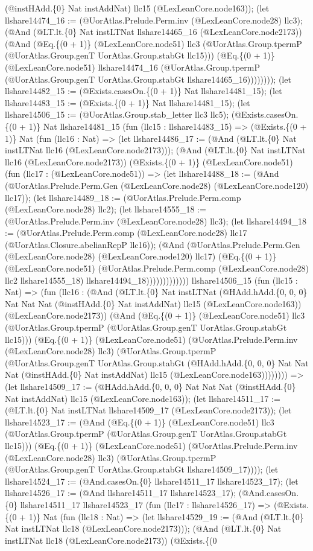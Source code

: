 \documentclass[11pt]{article}
\begin{document}
(@instHAdd.\{0\} Nat instAddNat) llc15 (@LexLeanCore.node163)); (let llshare14474\_16 := (@UorAtlas.Prelude.Perm.inv (@LexLeanCore.node28) llc3); (@And (@LT.lt.\{0\} Nat instLTNat llshare14465\_16 (@LexLeanCore.node2173)) (@And (@Eq.\{(0 + 1)\} (@LexLeanCore.node51) llc3 (@UorAtlas.Group.tpermP (@UorAtlas.Group.genT UorAtlas.Group.stabGt llc15))) (@Eq.\{(0 + 1)\} (@LexLeanCore.node51) llshare14474\_16 (@UorAtlas.Group.tpermP (@UorAtlas.Group.genT UorAtlas.Group.stabGt llshare14465\_16)))))))); (let llshare14482\_15 := (@Exists.casesOn.\{(0 + 1)\} Nat llshare14481\_15); (let llshare14483\_15 := (@Exists.\{(0 + 1)\} Nat llshare14481\_15); (let llshare14506\_15 := (@UorAtlas.Group.stab\_letter llc3 llc5); (@Exists.casesOn.\{(0 + 1)\} Nat llshare14481\_15 (fun (llc15 : llshare14483\_15) => (@Exists.\{(0 + 1)\} Nat (fun (llc16 : Nat) => (let llshare14486\_17 := (@And (@LT.lt.\{0\} Nat instLTNat llc16 (@LexLeanCore.node2173))); (@And (@LT.lt.\{0\} Nat instLTNat llc16 (@LexLeanCore.node2173)) (@Exists.\{(0 + 1)\} (@LexLeanCore.node51) (fun (llc17 : (@LexLeanCore.node51)) => (let llshare14488\_18 := (@And (@UorAtlas.Prelude.Perm.Gen (@LexLeanCore.node28) (@LexLeanCore.node120) llc17)); (let llshare14489\_18 := (@UorAtlas.Prelude.Perm.comp (@LexLeanCore.node28) llc2); (let llshare14555\_18 := (@UorAtlas.Prelude.Perm.inv (@LexLeanCore.node28) llc3); (let llshare14494\_18 := (@UorAtlas.Prelude.Perm.comp (@LexLeanCore.node28) llc17 (@UorAtlas.Closure.abelianRepP llc16)); (@And (@UorAtlas.Prelude.Perm.Gen (@LexLeanCore.node28) (@LexLeanCore.node120) llc17) (@Eq.\{(0 + 1)\} (@LexLeanCore.node51) (@UorAtlas.Prelude.Perm.comp (@LexLeanCore.node28) llc2 llshare14555\_18) llshare14494\_18))))))))))))) llshare14506\_15 (fun (llc15 : Nat) => (fun (llc16 : (@And (@LT.lt.\{0\} Nat instLTNat (@HAdd.hAdd.\{0, 0, 0\} Nat Nat Nat (@instHAdd.\{0\} Nat instAddNat) llc15 (@LexLeanCore.node163)) (@LexLeanCore.node2173)) (@And (@Eq.\{(0 + 1)\} (@LexLeanCore.node51) llc3 (@UorAtlas.Group.tpermP (@UorAtlas.Group.genT UorAtlas.Group.stabGt llc15))) (@Eq.\{(0 + 1)\} (@LexLeanCore.node51) (@UorAtlas.Prelude.Perm.inv (@LexLeanCore.node28) llc3) (@UorAtlas.Group.tpermP (@UorAtlas.Group.genT UorAtlas.Group.stabGt (@HAdd.hAdd.\{0, 0, 0\} Nat Nat Nat (@instHAdd.\{0\} Nat instAddNat) llc15 (@LexLeanCore.node163)))))))) => (let llshare14509\_17 := (@HAdd.hAdd.\{0, 0, 0\} Nat Nat Nat (@instHAdd.\{0\} Nat instAddNat) llc15 (@LexLeanCore.node163)); (let llshare14511\_17 := (@LT.lt.\{0\} Nat instLTNat llshare14509\_17 (@LexLeanCore.node2173)); (let llshare14523\_17 := (@And (@Eq.\{(0 + 1)\} (@LexLeanCore.node51) llc3 (@UorAtlas.Group.tpermP (@UorAtlas.Group.genT UorAtlas.Group.stabGt llc15))) (@Eq.\{(0 + 1)\} (@LexLeanCore.node51) (@UorAtlas.Prelude.Perm.inv (@LexLeanCore.node28) llc3) (@UorAtlas.Group.tpermP (@UorAtlas.Group.genT UorAtlas.Group.stabGt llshare14509\_17)))); (let llshare14524\_17 := (@And.casesOn.\{0\} llshare14511\_17 llshare14523\_17); (let llshare14526\_17 := (@And llshare14511\_17 llshare14523\_17); (@And.casesOn.\{0\} llshare14511\_17 llshare14523\_17 (fun (llc17 : llshare14526\_17) => (@Exists.\{(0 + 1)\} Nat (fun (llc18 : Nat) => (let llshare14529\_19 := (@And (@LT.lt.\{0\} Nat instLTNat llc18 (@LexLeanCore.node2173))); (@And (@LT.lt.\{0\} Nat instLTNat llc18 (@LexLeanCore.node2173)) (@Exists.\{(0 
\end{document}
